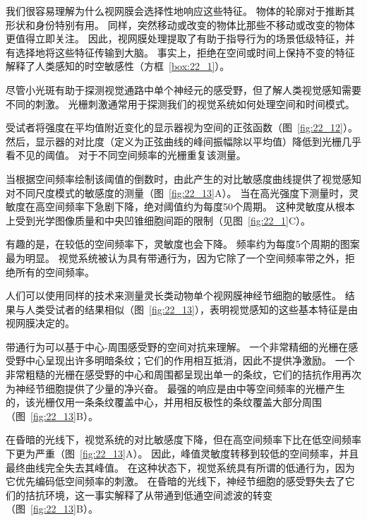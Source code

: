 我们很容易理解为什么视网膜会选择性地响应这些特征。 
物体的轮廓对于推断其形状和身份特别有用。
同样，突然移动或改变的物体比那些不移动或改变的物体更值得立即关注。
因此，视网膜处理提取了有助于指导行为的场景低级特征，并有选择地将这些特征传输到大脑。
事实上，拒绝在空间或时间上保持不变的特征解释了人类感知的时空敏感性（方框~\ref{box:22_1}）。


\begin{proposition}[人类感知的时空敏感性] \label{box:22_1}
	
	\quad \quad 尽管小光斑有助于探测视觉通路中单个神经元的感受野，但了解人类视觉感知需要不同的刺激。
	光栅刺激通常用于探测我们的视觉系统如何处理空间和时间模式。
	
	\quad \quad 受试者将强度在平均值附近变化的显示器视为空间的正弦函数（图~\ref{fig:22_12}）。
	然后，显示器的对比度（定义为正弦曲线的峰间振幅除以平均值）降低到光栅几乎看不见的阈值。
	对于不同空间频率的光栅重复该测量。
	
	\quad \quad 当根据空间频率绘制该阈值的倒数时，由此产生的对比敏感度曲线提供了视觉感知对不同尺度模式的敏感度的测量（图~\ref{fig:22_13}A）。
	当在高光强度下测量时，灵敏度在高空间频率下急剧下降，绝对阈值约为每度50个周期。
	这种灵敏度从根本上受到光学图像质量和中央凹锥细胞间距的限制（见图~\ref{fig:22_1}C）。
	
	\quad \quad 有趣的是，在较低的空间频率下，灵敏度也会下降。
	频率约为每度5个周期的图案最为明显。
	视觉系统被认为具有带通行为，因为它除了一个空间频率带之外，拒绝所有的空间频率。
	
	\quad \quad 人们可以使用同样的技术来测量灵长类动物单个视网膜神经节细胞的敏感性。
	结果与人类受试者的结果相似（图~\ref{fig:22_13}），表明视觉感知的这些基本特征是由视网膜决定的。
	
	\quad \quad 带通行为可以基于中心-周围感受野的空间对抗来理解。
	一个非常精细的光栅在感受野中心呈现出许多明暗条纹；它们的作用相互抵消，因此不提供净激励。
	一个非常粗糙的光栅在感受野的中心和周围都呈现出单一的条纹，它们的拮抗作用再次为神经节细胞提供了少量的净兴奋。
	最强的响应是由中等空间频率的光栅产生的，该光栅仅用一条条纹覆盖中心，并用相反极性的条纹覆盖大部分周围（图~\ref{fig:22_13}B）。
	
	\quad \quad 在昏暗的光线下，视觉系统的对比敏感度下降，但在高空间频率下比在低空间频率下更为严重（图~\ref{fig:22_13}A）。
	因此，峰值灵敏度转移到较低的空间频率，并且最终曲线完全失去其峰值。
	在这种状态下，视觉系统具有所谓的低通行为，因为它优先编码低空间频率的刺激。
	在昏暗的光线下，神经节细胞的感受野失去了它们的拮抗环境，这一事实解释了从带通到低通空间滤波的转变（图~\ref{fig:22_13}B）。
	

\end{proposition}
